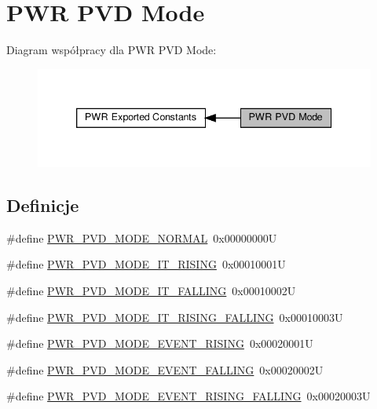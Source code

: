\hypertarget{group___p_w_r___p_v_d___mode}{}\section{P\+WR P\+VD Mode}
\label{group___p_w_r___p_v_d___mode}
Diagram współpracy dla P\+WR P\+VD Mode\+:\nopagebreak
\begin{figure}[H]
\begin{center}
\leavevmode
\includegraphics[width=339pt]{group___p_w_r___p_v_d___mode}
\end{center}
\end{figure}
\subsection*{Definicje}
\begin{DoxyCompactItemize}
\item 
\#define \hyperlink{group___p_w_r___p_v_d___mode_ga3a4bf701a36a14a4edf4dc5a28153277}{P\+W\+R\+\_\+\+P\+V\+D\+\_\+\+M\+O\+D\+E\+\_\+\+N\+O\+R\+M\+AL}~0x00000000U
\item 
\#define \hyperlink{group___p_w_r___p_v_d___mode_ga102d7b8354419990a2a780f61cd020a6}{P\+W\+R\+\_\+\+P\+V\+D\+\_\+\+M\+O\+D\+E\+\_\+\+I\+T\+\_\+\+R\+I\+S\+I\+NG}~0x00010001U
\item 
\#define \hyperlink{group___p_w_r___p_v_d___mode_gab600a54f3a588de836cfe4b727ab8a53}{P\+W\+R\+\_\+\+P\+V\+D\+\_\+\+M\+O\+D\+E\+\_\+\+I\+T\+\_\+\+F\+A\+L\+L\+I\+NG}~0x00010002U
\item 
\#define \hyperlink{group___p_w_r___p_v_d___mode_gac531fbf14457e6595505354fad521b67}{P\+W\+R\+\_\+\+P\+V\+D\+\_\+\+M\+O\+D\+E\+\_\+\+I\+T\+\_\+\+R\+I\+S\+I\+N\+G\+\_\+\+F\+A\+L\+L\+I\+NG}~0x00010003U
\item 
\#define \hyperlink{group___p_w_r___p_v_d___mode_ga1a946b01887aa886de329a92c3ab0dd4}{P\+W\+R\+\_\+\+P\+V\+D\+\_\+\+M\+O\+D\+E\+\_\+\+E\+V\+E\+N\+T\+\_\+\+R\+I\+S\+I\+NG}~0x00020001U
\item 
\#define \hyperlink{group___p_w_r___p_v_d___mode_gaaedbe45f1a1ea6c30af6ac51abae0cae}{P\+W\+R\+\_\+\+P\+V\+D\+\_\+\+M\+O\+D\+E\+\_\+\+E\+V\+E\+N\+T\+\_\+\+F\+A\+L\+L\+I\+NG}~0x00020002U
\item 
\#define \hyperlink{group___p_w_r___p_v_d___mode_ga7455387c8e9049f9f66b46423d4f4091}{P\+W\+R\+\_\+\+P\+V\+D\+\_\+\+M\+O\+D\+E\+\_\+\+E\+V\+E\+N\+T\+\_\+\+R\+I\+S\+I\+N\+G\+\_\+\+F\+A\+L\+L\+I\+NG}~0x00020003U
\end{DoxyCompactItemize}


